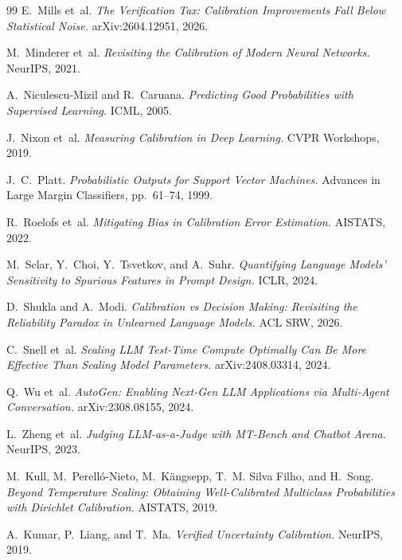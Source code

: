 \documentclass[11pt]{article}
\begin{document}
\begin{thebibliography}{99}
 E.~Mills et~al.
\newblock \textit{The Verification Tax: Calibration Improvements Fall Below Statistical Noise.}
\newblock arXiv:2604.12951, 2026.

 M.~Minderer et~al.
\newblock \textit{Revisiting the Calibration of Modern Neural Networks.}
\newblock NeurIPS, 2021.

 A.~Niculescu-Mizil and R.~Caruana.
\newblock \textit{Predicting Good Probabilities with Supervised Learning.}
\newblock ICML, 2005.

 J.~Nixon et~al.
\newblock \textit{Measuring Calibration in Deep Learning.}
\newblock CVPR Workshops, 2019.

 J.~C.~Platt.
\newblock \textit{Probabilistic Outputs for Support Vector Machines.}
\newblock Advances in Large Margin Classifiers, pp.~61--74, 1999.

 R.~Roelofs et~al.
\newblock \textit{Mitigating Bias in Calibration Error Estimation.}
\newblock AISTATS, 2022.

 M.~Sclar, Y.~Choi, Y.~Tsvetkov, and A.~Suhr.
\newblock \textit{Quantifying Language Models' Sensitivity to Spurious Features in Prompt Design.}
\newblock ICLR, 2024.

 D.~Shukla and A.~Modi.
\newblock \textit{Calibration vs Decision Making: Revisiting the Reliability Paradox in Unlearned Language Models.}
\newblock ACL SRW, 2026.

 C.~Snell et~al.
\newblock \textit{Scaling LLM Test-Time Compute Optimally Can Be More Effective Than Scaling Model Parameters.}
\newblock arXiv:2408.03314, 2024.

 Q.~Wu et~al.
\newblock \textit{AutoGen: Enabling Next-Gen LLM Applications via Multi-Agent Conversation.}
\newblock arXiv:2308.08155, 2024.

 L.~Zheng et~al.
\newblock \textit{Judging LLM-as-a-Judge with MT-Bench and Chatbot Arena.}
\newblock NeurIPS, 2023.

 M.~Kull, M.~Perell\'o-Nieto, M.~K\"angsepp, T.~M. Silva Filho, and H.~Song.
\newblock \textit{Beyond Temperature Scaling: Obtaining Well-Calibrated Multiclass Probabilities with Dirichlet Calibration.}
\newblock AISTATS, 2019.

 A.~Kumar, P.~Liang, and T.~Ma.
\newblock \textit{Verified Uncertainty Calibration.}
\newblock NeurIPS, 2019.

\end{thebibliography}
\end{document}
